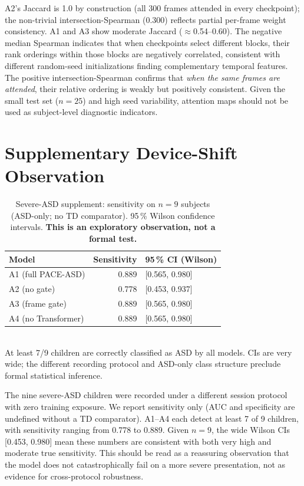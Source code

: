 \documentclass[a4paper,fleqn]{cas-sc}
\begin{document}
A2's Jaccard is 1.0 by construction (all 300 frames attended in every checkpoint);
the non-trivial intersection-Spearman (0.300) reflects partial per-frame weight
consistency.
A1 and A3 show moderate Jaccard ($\approx$0.54--0.60).
The negative median Spearman indicates that when checkpoints select different
blocks, their rank orderings within those blocks are negatively correlated,
consistent with different random-seed initializations finding complementary
temporal features.
The positive intersection-Spearman confirms that \textit{when the same frames
are attended}, their relative ordering is weakly but positively consistent.
Given the small test set ($n=25$) and high seed variability, attention maps
should not be used as subject-level diagnostic indicators.

\section{Supplementary Device-Shift Observation}
\label{sec:supp_eval}

\begin{table}[h!]
  \centering
  \caption{%
    Severe-ASD supplement: sensitivity on $n=9$ subjects (ASD-only;
    no TD comparator). 95\,\% Wilson confidence intervals.
    \textbf{This is an exploratory observation, not a formal test.}}
  \label{tab:supplement}
  \small
  \begin{tabularx}{\linewidth}{@{}l r l@{}}
    \toprule
    Model & Sensitivity & 95\,\% CI (Wilson) \\
    \midrule
    A1 (full PACE-ASD)  & 0.889 & [0.565, 0.980] \\
    A2 (no gate)        & 0.778 & [0.453, 0.937] \\
    A3 (frame gate)     & 0.889 & [0.565, 0.980] \\
    A4 (no Transformer) & 0.889 & [0.565, 0.980] \\
    \bottomrule
  \end{tabularx}
  \\[4pt]
  \footnotesize
  At least 7/9 children are correctly classified as ASD by all models.
  CIs are very wide; the different recording protocol and ASD-only class
  structure preclude formal statistical inference.
\end{table}

The nine severe-ASD children were recorded under a different session protocol
with zero training exposure.
We report sensitivity only (AUC and specificity are undefined without a TD
comparator).
A1--A4 each detect at least 7 of 9 children, with sensitivity ranging from
0.778 to 0.889.
Given $n=9$, the wide Wilson CIs [0.453, 0.980] mean these numbers are
consistent with both very high and moderate true sensitivity.
This should be read as a reassuring observation that the model does not
catastrophically fail on a more severe presentation, not as evidence for
cross-protocol robustness.
\end{document}
